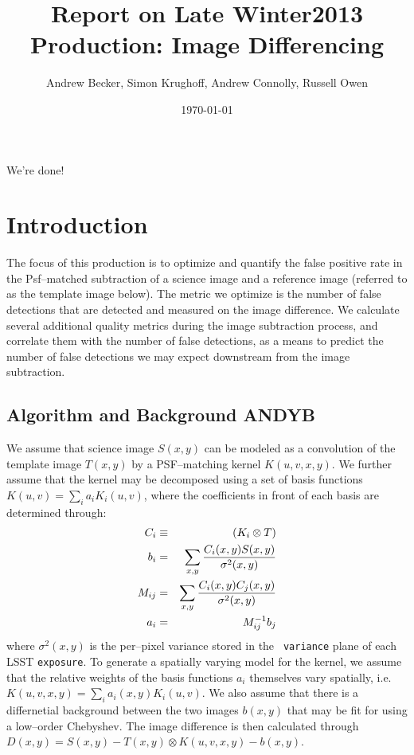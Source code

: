 \documentclass[prd, nofootinbib, floatfix, 11pt,tightenlines,times]{article}
\author{Andrew Becker, Simon Krughoff, Andrew Connolly, Russell Owen}
\title{Report on Late Winter2013 Production: Image Differencing}
\date{\today}
\begin{document}
\maketitle

We're done!

\clearpage
\tableofcontents
\clearpage

\section{Introduction}

The focus of this production is to optimize and quantify the false
positive rate in the Psf--matched subtraction of a science image and a
reference image (referred to as the template image below).  The metric
we optimize is the number of false detections that are detected and
measured on the image difference.  We calculate several additional
quality metrics during the image subtraction process, and correlate
them with the number of false detections, as a means to predict the
number of false detections we may expect downstream from the image
subtraction.

\subsection{Algorithm and Background {\bf ANDYB}}

We assume that science image $S(x,y)$ can be modeled as a convolution
of the template image $T(x,y)$ by a PSF--matching kernel $K(u,v,x,y)$.
We further assume that the kernel may be decomposed using a set of
basis functions $K(u,v) = \sum_i a_i K_i(u,v)$, where the coefficients
in front of each basis are determined through:
%
\begin{eqnarray}
C_i & \equiv & (K_i \otimes T) \\ \nonumber
b_{i}  & = & \sum_{x,y} {{C_i(x,y) S(x,y)}\over{\sigma^2(x,y)}}   \nonumber \\ 
M_{ij} & = & \sum_{x,y} {{C_i(x,y) C_j(x,y)}\over{\sigma^2(x,y)}}  \nonumber \\ 
a_{i}  & = & M^{-1}_{ij} b_{j} \nonumber 
\label{eq-soln}
\end{eqnarray}
where $\sigma^2(x,y)$ is the per--pixel variance stored in the {\tt
  variance} plane of each LSST {\tt exposure}.  To generate a
spatially varying model for the kernel, we assume that the relative
weights of the basis functions $a_i$ themselves vary spatially,
i.e. $K(u,v,x,y) = \sum_i a_i(x,y) K_i(u,v)$.  We also assume that
there is a differnetial background between the two images $b(x,y)$
that may be fit for using a low--order Chebyshev.  The image
difference is then calculated through $D(x,y) = S(x,y) - T(x,y)
\otimes K(u,v,x,y) - b(x,y)$.
\end{document}
